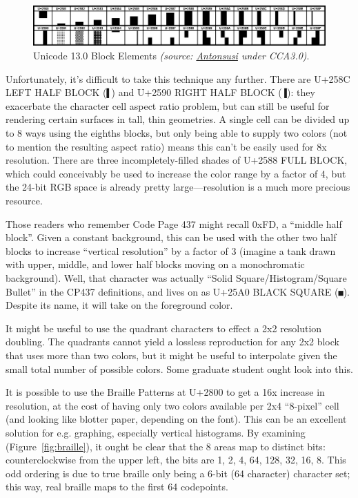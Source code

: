 \begin{figure}[!htb]
    \centering
    \includegraphics[width=.75\linewidth]{media/blockelements.png}
    \caption{Unicode 13.0 Block Elements \textit{(source: \href{https://commons.wikimedia.org/wiki/File:UCB_Block_Elements.png}{Antonsusi} under CCA3.0)}.}
    \label{fig:blockelements}
\end{figure}

Unfortunately, it's difficult to take this technique any further. There are
U+258C LEFT HALF BLOCK (\texttt{▌}) and U+2590 RIGHT HALF BLOCK (\texttt{▐}):
they exacerbate the character cell aspect ratio problem, but can still be
useful for rendering certain surfaces in tall, thin geometries. A single cell
can be divided up to 8 ways using the eighths blocks, but only being able to
supply two colors (not to mention the resulting aspect ratio) means this can't
be easily used for 8x resolution. There are three incompletely-filled shades of
U+2588 FULL BLOCK, which could conceivably be used to increase the color range
by a factor of 4, but the 24-bit RGB space is already pretty large---resolution
is a much more precious resource.

Those readers who remember Code Page 437 might recall 0xFD, a ``middle half
block''. Given a constant background, this can be used with the other two
half blocks to increase ``vertical resolution'' by a factor of 3 (imagine a
tank drawn with upper, middle, and lower half blocks moving on a monochromatic
background). Well, that character was actually ``Solid Square/Histogram/Square Bullet''
in the CP437 definitions\cite{cp437}, and lives on as U+25A0 BLACK SQUARE (\texttt{■}).
Despite its name, it will take on the foreground color.

It might be useful to use the quadrant characters to effect a 2x2 resolution
doubling. The quadrants cannot yield a lossless reproduction for any 2x2 block
that uses more than two colors, but it might be useful to interpolate given the
small total number of possible colors. Some graduate student ought look
into this.

It is possible to use the Braille Patterns at U+2800 to get a 16x increase in
resolution, at the cost of having only two colors available per 2x4 ``8-pixel''
cell (and looking like blotter paper, depending on the font). This can be an
excellent solution for e.g. graphing, especially vertical histograms. By
examining (Figure~\ref{fig:braille}), it ought be clear that the 8 areas
map to distinct bits: counterclockwise from the upper left, the bits are 1, 2,
4, 64, 128, 32, 16, 8. This odd ordering is due to true braille only being a
6-bit (64 character) character set; this way, real braille maps to the first
64 codepoints.

